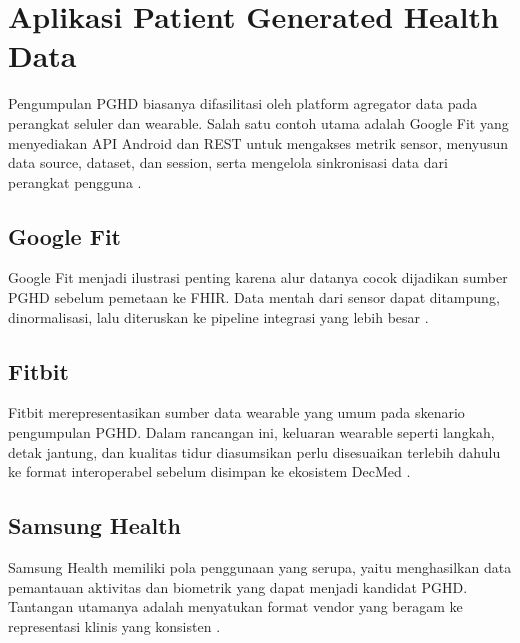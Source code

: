 \section{Aplikasi Patient Generated Health Data}

Pengumpulan PGHD biasanya difasilitasi oleh platform agregator data pada perangkat seluler dan wearable. Salah satu contoh utama adalah Google Fit yang menyediakan API Android dan REST untuk mengakses metrik sensor, menyusun data source, dataset, dan session, serta mengelola sinkronisasi data dari perangkat pengguna \parencite{Google_Fit_2025}.

\subsection{Google Fit}
Google Fit menjadi ilustrasi penting karena alur datanya cocok dijadikan sumber PGHD sebelum pemetaan ke FHIR. Data mentah dari sensor dapat ditampung, dinormalisasi, lalu diteruskan ke pipeline integrasi yang lebih besar \parencite{Google_Fit_2025,HL7_FHIR_2025}.

\subsection{Fitbit}
Fitbit merepresentasikan sumber data wearable yang umum pada skenario pengumpulan PGHD. Dalam rancangan ini, keluaran wearable seperti langkah, detak jantung, dan kualitas tidur diasumsikan perlu disesuaikan terlebih dahulu ke format interoperabel sebelum disimpan ke ekosistem DecMed \parencite{Mars_Scott_2022,Khatiwada_Yang_Lin_Blobel_2024}.

\subsection{Samsung Health}
Samsung Health memiliki pola penggunaan yang serupa, yaitu menghasilkan data pemantauan aktivitas dan biometrik yang dapat menjadi kandidat PGHD. Tantangan utamanya adalah menyatukan format vendor yang beragam ke representasi klinis yang konsisten \parencite{Mars_Scott_2022,Omoloja_Vundavalli_2021}.